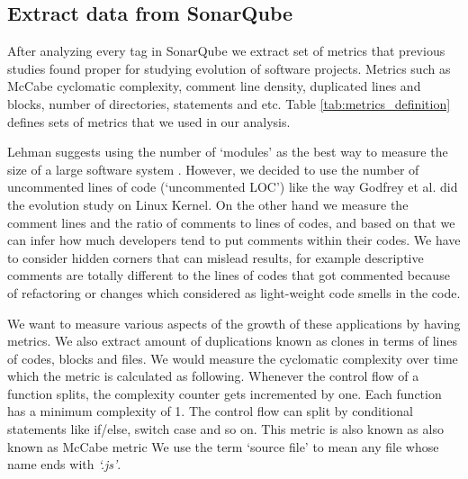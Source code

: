 \subsection{Extract data from SonarQube}
\par After analyzing every tag in SonarQube we extract set of metrics that previous studies found proper for studying evolution of software projects. Metrics such as McCabe cyclomatic complexity, comment line density, duplicated lines and blocks, number of directories, statements and etc. Table  \ref{tab:metrics_definition} defines sets of metrics that we used in our analysis.

\par
Lehman suggests using the number of `modules' as the best way to measure the size of a large software system \cite{Lehman1997METRICS}. However, we decided to use the number of uncommented lines of code (`uncommented LOC') like the way Godfrey et al. \cite{Godfrey2000ICMS} did the evolution study on Linux Kernel. On the other hand we measure the comment lines and the ratio of comments to lines of codes, and based on that we can infer how much developers tend to put comments within their codes. We have to consider hidden corners that can mislead results, for example descriptive comments are totally different to the lines of codes that got commented because of refactoring or changes which considered as light-weight code smells in the code.

\par
We want to measure various aspects of the growth of these applications by having metrics. We also extract amount of duplications known as clones in terms of lines of codes, blocks and files. We would measure the cyclomatic complexity over time which the metric is calculated as following. Whenever the control flow of a function splits, the complexity counter gets incremented by one. Each function has a minimum complexity of 1. The control flow can split by conditional statements like if/else, switch case and so on. This metric is also known as also known as McCabe metric
We use the term `source file' to mean any file whose name ends with \textit{`.js'}.

